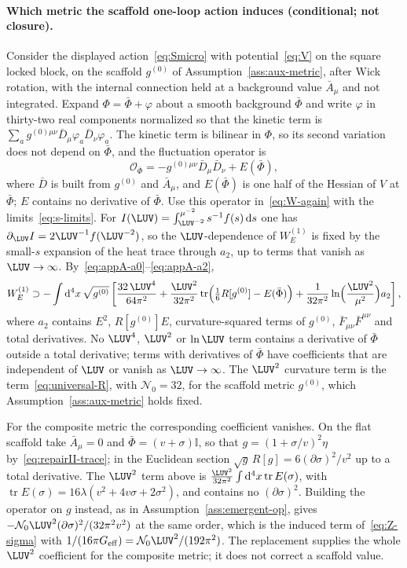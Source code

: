 \paragraph{Which metric the scaffold one-loop action induces (conditional; not closure).}
Consider the displayed action~\eqref{eq:Smicro} with
potential~\eqref{eq:V} on the square locked block, on the scaffold
\(g^{(0)}\) of Assumption~\ref{ass:aux-metric}, after Wick rotation,
with the internal connection held at a background value
\(\bar A_\mu\) and not integrated. Expand \(\Phi=\bar\Phi+\varphi\)
about a smooth background \(\bar\Phi\) and write \(\varphi\) in
thirty-two real components normalized so that the kinetic term is
\(\sum_a g^{(0)\mu\nu}\bar D_\mu\varphi_a\bar D_\nu\varphi_a\). The
kinetic term is bilinear in \(\Phi\), so its second variation does not
depend on \(\bar\Phi\), and the fluctuation operator is
\[
  \mathcal O_{\bar\Phi}
  =-g^{(0)\mu\nu}\bar D_\mu\bar D_\nu+E(\bar\Phi),
\]
where \(\bar D\) is built from \(g^{(0)}\) and \(\bar A_\mu\), and
\(E(\bar\Phi)\) is one half of the Hessian of \(V\) at \(\bar\Phi\);
\(E\) contains no derivative of \(\bar\Phi\). Use this operator
in~\eqref{eq:W-again} with the limits~\eqref{eq:s-limits}. For
\(I(\LUV)=\int_{\LUV^{-2}}^{\mu^{-2}}s^{-1}f(s)\,\mathrm{d}s\) one has
\(\partial_{\LUV}I=2\LUV^{-1}f(\LUV^{-2})\), so the
\(\LUV\)-dependence of \(W_E^{(1)}\) is fixed by the small-\(s\)
expansion of the heat trace through \(a_2\), up to terms that vanish as
\(\LUV\to\infty\). By~\eqref{eq:appA-a0}--\eqref{eq:appA-a2},
\[
  W_E^{(1)}\supset
  -\int\mathrm{d}^4x\,\sqrt{g^{(0)}}\left[
    \frac{32\,\LUV^4}{64\pi^2}
    +\frac{\LUV^2}{32\pi^2}
     \operatorname{tr}\Bigl(\tfrac16R[g^{(0)}]-E(\bar\Phi)\Bigr)
    +\frac{1}{32\pi^2}\ln\Bigl(\frac{\LUV^2}{\mu^2}\Bigr)a_2
  \right],
\]
where \(a_2\) contains \(E^2\), \(R[g^{(0)}]E\), curvature-squared
terms of \(g^{(0)}\), \(\bar F_{\mu\nu}\bar F^{\mu\nu}\) and total
derivatives. No \(\LUV^4\), \(\LUV^2\) or \(\ln\LUV\) term contains a derivative of
\(\bar\Phi\) outside a total derivative; terms with derivatives of
\(\bar\Phi\) have coefficients that are independent of \(\LUV\) or vanish
as \(\LUV\to\infty\). The \(\LUV^2\) curvature term
is the term~\eqref{eq:universal-R}, with \(\mathcal N_0=32\), for the
scaffold metric \(g^{(0)}\), which Assumption~\ref{ass:aux-metric}
holds fixed.

For the composite metric the corresponding coefficient vanishes. On
the flat scaffold take \(\bar A_\mu=0\) and
\(\bar\Phi=(v+\sigma)\mathbb I\), so that
\(g=(1+\sigma/v)^2\eta\) by~\eqref{eq:repairII-trace}; in the
Euclidean section \(\sqrt g\,R[g]=6(\partial\sigma)^2/v^2\) up to a
total derivative. The \(\LUV^2\) term above is
\(\tfrac{\LUV^2}{32\pi^2}\int\mathrm{d}^4x\operatorname{tr}E(\sigma)\),
with \(\operatorname{tr}E(\sigma)=16\lambda(v^2+4v\sigma+2\sigma^2)\),
and contains no \((\partial\sigma)^2\). Building the operator on \(g\)
instead, as in Assumption~\ref{ass:emergent-op}, gives
\(-\mathcal N_0\LUV^2(\partial\sigma)^2/(32\pi^2v^2)\) at the same
order, which is the induced term of~\eqref{eq:Z-sigma} with
\(1/(16\pi G_{\mathrm{eff}})=\mathcal N_0\LUV^2/(192\pi^2)\). The
replacement supplies the whole \(\LUV^2\) coefficient for the composite
metric; it does not correct a scaffold value.

